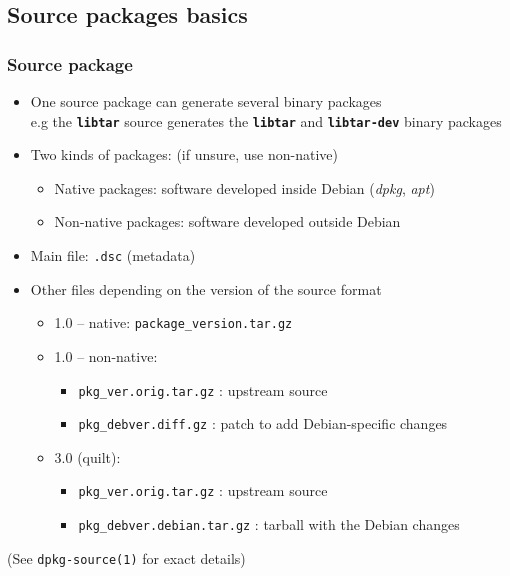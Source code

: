 \documentclass[10pt,final]{beamer}
\begin{document}
\subsection{Source packages basics}
\begin{frame}
\frametitle{Source package}
\begin{itemize}
	\item One source package can generate several binary packages\\
		{\small e.g the \texttt{\bfseries libtar} source generates the \texttt{\bfseries libtar} and \texttt{\bfseries libtar-dev} binary packages}
		\hbr
	\item Two kinds of packages: (if unsure, use non-native)
		\begin{itemize}
				\small
			\item Native packages: software developed inside Debian (\textsl{dpkg}, \textsl{apt})
			\item Non-native packages: software developed outside Debian
		\end{itemize}
		\hbr
	\item Main file: \texttt{.dsc} (metadata)
		\hbr
	\item Other files depending on the version of the source format
	\begin{itemize}
		\item 1.0 -- native: \texttt{package\_version.tar.gz}
		\hbr
		\item 1.0 -- non-native:
		\begin{itemize}
			\item \texttt{pkg\_ver.orig.tar.gz} : upstream source
			\item \texttt{pkg\_debver.diff.gz} : patch to add Debian-specific changes
		\end{itemize}
		\hbr
		\item 3.0 (quilt):
		\begin{itemize}
			\item \texttt{pkg\_ver.orig.tar.gz} : upstream source
			\item \texttt{pkg\_debver.debian.tar.gz} : tarball with the Debian changes
		\end{itemize}
	\end{itemize}
\end{itemize}
\br
(See \texttt{dpkg-source(1)} for exact details)
\end{frame}
\end{document}
